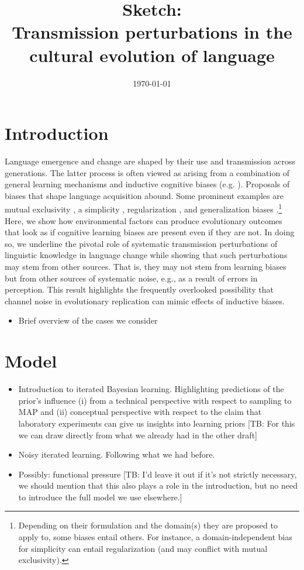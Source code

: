 \documentclass[11pt]{article}
\title{Sketch:\\Transmission perturbations in the cultural evolution of language}
\author{%
    \today
}
\date{}
\newcommand{\tb}[1]{\textcolor[rgb]{.8,.33,.0}{[TB: #1]}}%
\begin{document}
\maketitle

\section{Introduction}
Language emergence and change are shaped by their use and transmission across generations. The latter process is often viewed as arising from a combination of general learning mechanisms and inductive cognitive biases (e.g. \citealt{griffiths+kalish:2007,kirby+etal:2014,tamariz+kirby:2016}).  Proposals of biases that shape language acquisition abound. Some prominent examples are mutual exclusivity \citep{merriman+bowman:1989,clark:2009}, a simplicity \citep{kirby+etal:2015}, regularization \citep{hudson+etal:2005}, and generalization biases \citep{smith:2011,oconnor:2015}.\footnote{Depending on their formulation and the domain(s) they are proposed to apply to, some biases entail others. For instance, a domain-independent bias for simplicity can entail regularization (and may conflict with mutual exclusivity).} Here, we show how environmental factors can produce evolutionary outcomes that look as if cognitive learning biases are present even if they are not. In doing so, we underline the pivotal role of systematic transmission perturbations of linguistic knowledge in language change while showing that such perturbations may stem from other sources. That is, they may not stem from learning biases but from other sources of systematic noise, e.g., as a result of errors in perception. This result highlights the frequently overlooked possibility that channel noise in evolutionary replication can mimic effects of inductive biases.

\begin{itemize}
  \item Brief overview of the cases we consider
\end{itemize}


\section{Model}

\begin{itemize}
  \item Introduction to iterated Bayesian learning. Highlighting predictions of the prior's influence (i) from a technical perspective with respect to sampling to MAP and (ii) conceptual perspective with respect to the claim that laboratory experiments can give us insights into learning priors \tb{For this we can draw directly from what we already had in the other draft}
  \item Noisy iterated learning. Following what we had before.
  \item Possibly: functional pressure \tb{I'd leave it out if it's not strictly necessary, we should mention that this also plays a role in the introduction, but no need to introduce the full model we use elsewhere.}
\end{itemize}
\end{document}
